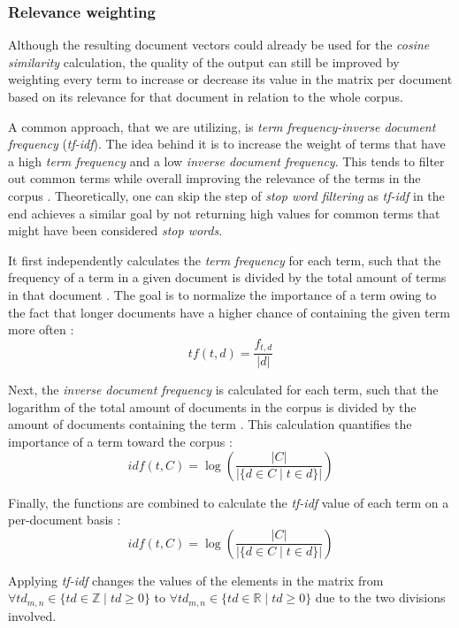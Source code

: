 \documentclass[12pt,a4paper]{report}
\begin{document}
\subsubsection{Relevance weighting}
Although the resulting document vectors
could already be used for the \textit{cosine similarity} calculation, the
quality of the output can still be improved by weighting every term to increase
or decrease its value in the matrix per document based on its relevance for
that document in relation to the whole corpus.

A common approach, that we are utilizing, is \textit{term frequency-inverse
document frequency} (\textit{tf-idf}). The idea behind it is to increase the
weight of terms that have a high \textit{term frequency} and a low \textit{
inverse document frequency}. This tends to filter out common terms while
overall improving the relevance of the terms in the corpus \cite{
robertson2004tfidf, singhal2001ir}. Theoretically, one can skip the step of
\textit{stop word filtering} as \textit{tf-idf} in the end achieves a similar
goal by not returning high values for common terms that might have been
considered \textit{stop words}.

It first independently calculates the \textit{term frequency} for each term,
such that the frequency of a term in a given document is divided by the total
amount of terms in that document \cite{robertson2004tfidf}. The goal is to
normalize the importance of a term owing to the fact that longer documents have
a higher chance of containing the given term more often \cite{singhal2001ir}:
\[
  tf(t,d) = \frac{f_{t, d}}{\vert d \vert}
\]

Next, the \textit{inverse document frequency} is calculated for each term, such
that the logarithm of the total amount of documents in the corpus is divided by
the amount of documents containing the term \cite{robertson2004tfidf}. This
calculation quantifies the importance of a term toward the corpus \cite{singhal2001ir}:
\[
  idf(t,C) = \log \left(\frac{\vert C \vert}{\vert \{d \in C \mid t \in d\} \vert}\right)
\]

Finally, the functions are combined to calculate the \textit{tf-idf} value of
each term on a per-document basis \cite{robertson2004tfidf}:
\[
  idf(t,C) = \log \left(\frac{\vert C \vert}{\vert \{d \in C \mid t \in d\} \vert}\right)
\]

Applying \textit{tf-idf} changes the values of the elements in the matrix from
\(\forall td_{m,n} \in \{td \in \mathbb{Z} \mid td \ge 0\}\) to
\(\forall td_{m,n} \in \{td \in \mathbb{R} \mid td \ge 0\}\) due to the
two divisions involved.
\end{document}
